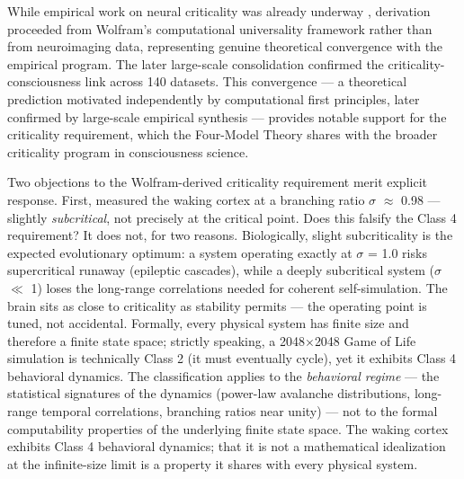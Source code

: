 \documentclass[12pt]{article}
\begin{document}
While empirical work on neural criticality was already underway \citep{Beggs2003,Tagliazucchi2012}, \citet{Gruber2015} derivation proceeded from Wolfram's computational universality framework rather than from neuroimaging data, representing genuine theoretical convergence with the empirical program. The later large-scale consolidation \citep{HengenShew2025,AlgomShriki2026} confirmed the criticality-consciousness link across 140 datasets. This convergence --- a theoretical prediction motivated independently by computational first principles, later confirmed by large-scale empirical synthesis --- provides notable support for the criticality requirement, which the Four-Model Theory shares with the broader criticality program in consciousness science.

Two objections to the Wolfram-derived criticality requirement merit explicit response. First, \citet{Priesemann2013,Priesemann2014} measured the waking cortex at a branching ratio $\sigma$ $\approx$ 0.98 --- slightly \emph{subcritical}, not precisely at the critical point. Does this falsify the Class 4 requirement? It does not, for two reasons. Biologically, slight subcriticality is the expected evolutionary optimum: a system operating exactly at $\sigma$ = 1.0 risks supercritical runaway (epileptic cascades), while a deeply subcritical system ($\sigma$ $\ll$ 1) loses the long-range correlations needed for coherent self-simulation. The brain sits as close to criticality as stability permits --- the operating point is tuned, not accidental. Formally, every physical system has finite size and therefore a finite state space; strictly speaking, a 2048$\times$2048 Game of Life simulation is technically Class 2 (it must eventually cycle), yet it exhibits Class 4 behavioral dynamics. The classification applies to the \emph{behavioral regime} --- the statistical signatures of the dynamics (power-law avalanche distributions, long-range temporal correlations, branching ratios near unity) --- not to the formal computability properties of the underlying finite state space. The waking cortex exhibits Class 4 behavioral dynamics; that it is not a mathematical idealization at the infinite-size limit is a property it shares with every physical system.
\end{document}
